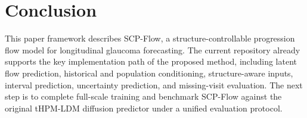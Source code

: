 \section{Conclusion}

This paper framework describes SCP-Flow, a structure-controllable progression flow model for longitudinal glaucoma forecasting. The current repository already supports the key implementation path of the proposed method, including latent flow prediction, historical and population conditioning, structure-aware inputs, interval prediction, uncertainty prediction, and missing-visit evaluation. The next step is to complete full-scale training and benchmark SCP-Flow against the original tHPM-LDM diffusion predictor under a unified evaluation protocol.
